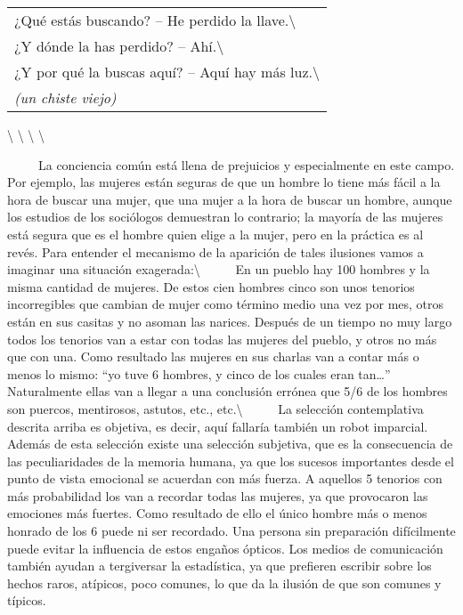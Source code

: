 \begin{longtable}[]{@{}l@{}}
\toprule
¿Qué estás buscando? -- He perdido la
llave.\textbackslash{}\tabularnewline
¿Y dónde la has perdido? -- Ahí.\textbackslash{}\tabularnewline
¿Y por qué la buscas aquí? -- Aquí hay más
luz.\textbackslash{}\tabularnewline
\emph{(un chiste viejo)}\tabularnewline
\bottomrule
\end{longtable}

\textbackslash{} \textbackslash{} \textbackslash{} \textbackslash{}

~ ~ ~ La conciencia común está llena de prejuicios y especialmente en
este campo. Por ejemplo, las mujeres están seguras de que un hombre lo
tiene más fácil a la hora de buscar una mujer, que una mujer a la hora
de buscar un hombre, aunque los estudios de los sociólogos demuestran lo
contrario; la mayoría de las mujeres está segura que es el hombre quien
elige a la mujer, pero en la práctica es al revés. Para entender el
mecanismo de la aparición de tales ilusiones vamos a imaginar una
situación exagerada:\textbackslash{} ~ ~ ~ En un pueblo hay 100 hombres
y la misma cantidad de mujeres. De estos cien hombres cinco son unos
tenorios incorregibles que cambian de mujer como término medio una vez
por mes, otros están en sus casitas y no asoman las narices. Después de
un tiempo no muy largo todos los tenorios van a estar con todas las
mujeres del pueblo, y otros no más que con una. Como resultado las
mujeres en sus charlas van a contar más o menos lo mismo: ``yo tuve 6
hombres, y cinco de los cuales eran tan\ldots{}'' Naturalmente ellas van
a llegar a una conclusión errónea que 5/6 de los hombres son puercos,
mentirosos, astutos, etc., etc.\textbackslash{} ~ ~ ~ La selección
contemplativa descrita arriba es objetiva, es decir, aquí fallaría
también un robot imparcial. Además de esta selección existe una
selección subjetiva, que es la consecuencia de las peculiaridades de la
memoria humana, ya que los sucesos importantes desde el punto de vista
emocional se acuerdan con más fuerza. A aquellos 5 tenorios con más
probabilidad los van a recordar todas las mujeres, ya que provocaron las
emociones más fuertes. Como resultado de ello el único hombre más o
menos honrado de los 6 puede ni ser recordado. Una persona sin
preparación difícilmente puede evitar la influencia de estos engaños
ópticos. Los medios de comunicación también ayudan a tergiversar la
estadística, ya que prefieren escribir sobre los hechos raros, atípicos,
poco comunes, lo que da la ilusión de que son comunes y típicos.

